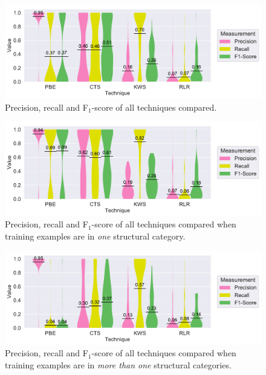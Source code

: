\documentclass[\myrootdir/main.tex]{subfiles}
\begin{document}
\begin{figure}[hp]
		\centering
		\includegraphics[width=\textwidth, clip]{img/big-study/recall-precision-all.pdf}
		\caption{Precision, recall and F$_{1}$-score of all techniques compared.}
		\label{fig:recall-precision-all}
\end{figure}

\begin{figure}[hp]
	\centering
		\includegraphics[width=\textwidth, clip]{img/big-study/recall-precision-singlecategory-all.pdf}
		\caption{Precision, recall and F$_{1}$-score of all techniques compared when training examples are in \emph{one} structural category.}
		\label{fig:recall-precision-singlecategory-all}
\end{figure}

\begin{figure}[hp]
		\centering
		\includegraphics[width=\textwidth, clip]{img/big-study/recall-precision-multicategory-all.pdf}
		\caption{Precision, recall and F$_{1}$-score of all techniques compared when training examples are in \emph{more than one} structural categories.}
		\label{fig:recall-precision-multicategory-all}
\end{figure}
\end{document}
